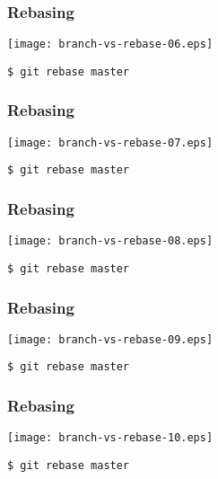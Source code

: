 \documentclass[english]{beamer}
\newcommand{\CMD}[1]{%
\texttt{\textcolor{code-green}{#1}}%
}
\begin{document}
\begin{frame}
\frametitle{Rebasing}

\texttt{[image: branch-vs-rebase-06.eps]}
\vspace{\baselineskip}
\begin{flushright}
        \CMD{\$ git rebase master}
\end{flushright}
\vspace{\textheight}
\end{frame}

\begin{frame}
\frametitle{Rebasing}

\texttt{[image: branch-vs-rebase-07.eps]}
\vspace{\baselineskip}
\begin{flushright}
        \CMD{\$ git rebase master}
\end{flushright}
\vspace{\textheight}
\end{frame}

\begin{frame}
\frametitle{Rebasing}

\texttt{[image: branch-vs-rebase-08.eps]}
\vspace{\baselineskip}
\begin{flushright}
        \CMD{\$ git rebase master}
\end{flushright}
\vspace{\textheight}
\end{frame}

\begin{frame}
\frametitle{Rebasing}

\texttt{[image: branch-vs-rebase-09.eps]}
\vspace{\baselineskip}
\begin{flushright}
        \CMD{\$ git rebase master}
\end{flushright}
\vspace{\textheight}
\end{frame}

\begin{frame}
\frametitle{Rebasing}

\texttt{[image: branch-vs-rebase-10.eps]}
\vspace{\baselineskip}
\begin{flushright}
        \CMD{\$ git rebase master}
\end{flushright}
\vspace{\textheight}
\end{frame}
\end{document}
